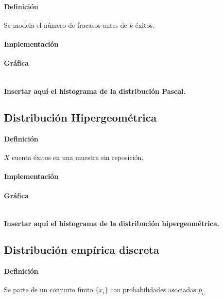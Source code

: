 \documentclass[11pt,a4paper]{article}
\begin{document}
\paragraph{Definición}
Se modela el número de fracasos antes de $k$ éxitos.

\paragraph{Implementación}


\paragraph{Gráfica}\\
\textbf{Insertar aquí el histograma de la distribución Pascal.}

\subsection{Distribución Hipergeométrica}
\paragraph{Definición}
$X$ cuenta éxitos en una muestra sin reposición.

\paragraph{Implementación}


\paragraph{Gráfica}\\
\textbf{Insertar aquí el histograma de la distribución hipergeométrica.}

\subsection{Distribución empírica discreta}
\paragraph{Definición}
Se parte de un conjunto finito $\{x_i\}$ con probabilidades asociadas $p_i$.
\end{document}
